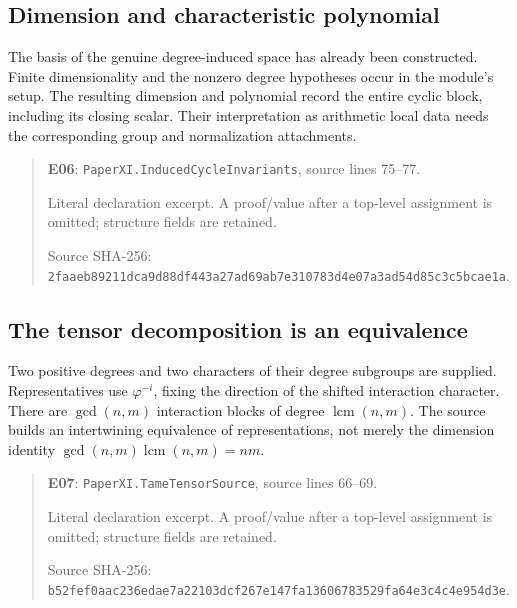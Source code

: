\documentclass[10pt,oneside]{book}
\begin{document}

\subsection{Dimension and characteristic polynomial}
\label{guide:E06}
The basis of the genuine degree-induced space has already been constructed. Finite dimensionality and the nonzero degree hypotheses occur in the module's setup.
The resulting dimension and polynomial record the entire cyclic block, including its closing scalar. Their interpretation as arithmetic local data needs the corresponding group and normalization attachments.

\begin{quote}\footnotesize\textbf{E06}: \nolinkurl{PaperXI.InducedCycleInvariants}, source lines 75--77.\par Literal declaration excerpt. A proof/value after a top-level assignment is omitted; structure fields are retained.\par Source SHA-256: {\scriptsize\texttt{2faaeb89211dca9d88df443a27ad69ab7e310783d4e07a3ad54d85c3c5bcae1a}}.\end{quote}


\subsection{The tensor decomposition is an equivalence}
\label{guide:E07}
Two positive degrees and two characters of their degree subgroups are supplied. Representatives use \(\varphi^{-i}\), fixing the direction of the shifted interaction character.
There are \(\gcd(n,m)\) interaction blocks of degree \(\operatorname{lcm}(n,m)\). The source builds an intertwining equivalence of representations, not merely the dimension identity \(\gcd(n,m)\operatorname{lcm}(n,m)=nm\).

\begin{quote}\footnotesize\textbf{E07}: \nolinkurl{PaperXI.TameTensorSource}, source lines 66--69.\par Literal declaration excerpt. A proof/value after a top-level assignment is omitted; structure fields are retained.\par Source SHA-256: {\scriptsize\texttt{b52fef0aac236edae7a22103dcf267e147fa13606783529fa64e3c4c4e954d3e}}.\end{quote}
\end{document}
